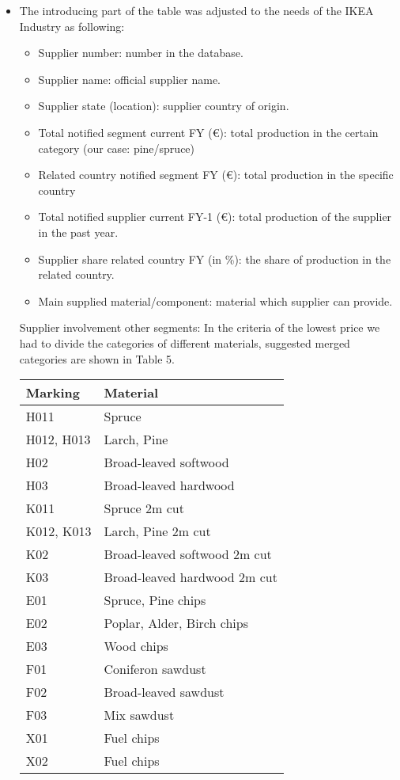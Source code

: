 \documentclass[oneside,12pt]{article}%
\begin{document}
\begin{itemize}
  \item The introducing part of the table was adjusted to the needs of the IKEA Industry as following:

    \begin{itemize}
      \item Supplier number: number in the database.
      \item Supplier name: official supplier name.
      \item Supplier state (location): supplier country of origin.
      \item Total notified segment current FY (\euro): total production in the certain category (our case: pine/spruce)
      \item Related country notified segment FY (\euro): total production in the specific country
      \item Total notified supplier current FY-1 (\euro): total production of the supplier in the past year.
      \item Supplier share related country FY (in \%): the share of production in the related country.
      \item Main supplied material/component: material which supplier can provide.
    \end{itemize}
    Supplier involvement other segments:
    In the criteria of the lowest price we had to divide the categories of different materials, suggested merged categories are shown in Table 5.


    \begin{table}[h]
      \tiny
      \begin{tabular}{l|l}
        Marking    & Material                     \\ \hline
        H011       & Spruce                       \\
        H012, H013 & Larch, Pine                  \\
        H02        & Broad-leaved softwood        \\
        H03        & Broad-leaved hardwood        \\
        K011       & Spruce 2m cut                \\
        K012, K013 & Larch, Pine 2m cut           \\
        K02        & Broad-leaved softwood 2m cut \\
        K03        & Broad-leaved hardwood 2m cut \\
        E01        & Spruce, Pine chips           \\
        E02        & Poplar, Alder, Birch chips   \\
        E03        & Wood chips                   \\
        F01        & Coniferon sawdust            \\
        F02        & Broad-leaved sawdust         \\
        F03        & Mix sawdust                  \\
        X01        & Fuel chips                   \\
        X02        & Fuel chips
      \end{tabular}
    \end{table}



\end{itemize}
\end{document}
